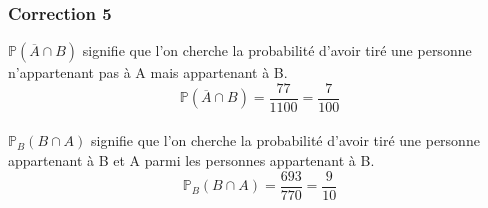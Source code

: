 \documentclass[15pt, mathserif]{beamer}
\begin{document}
\begin{frame}
\vspace{-10mm}
	\frametitle{Correction 5}

 $\mathbb{P}(\overline{A} \cap B)$ signifie que l'on cherche la probabilité d'avoir tiré une personne  n'appartenant pas à A mais appartenant à B. $$\mathbb{P}(\overline{A} \cap B)=\dfrac{77}{1100 }= \dfrac{7}{100}$$
 \\ $\mathbb{P}_{B} (B \cap A)$ signifie que l'on cherche la probabilité d'avoir tiré une personne appartenant à B et A parmi les personnes appartenant à B. $$\mathbb{P}_{B} (B \cap A) =\dfrac{693}{770 }= \dfrac{9}{10}$$
\end{frame}
\end{document}

